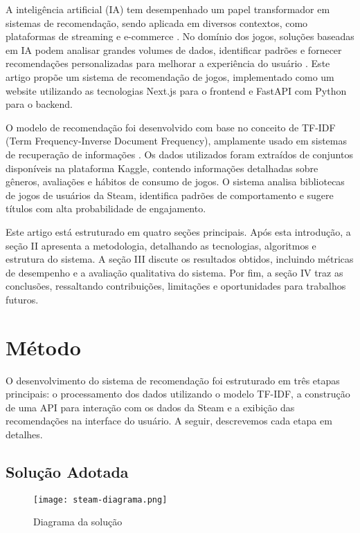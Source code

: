 \documentclass[conference]{IEEEtran}
\begin{document}
A inteligência artificial (IA) tem desempenhado um papel transformador em sistemas de recomendação, sendo aplicada em diversos contextos, como plataformas de streaming e e-commerce \cite{c3}. No domínio dos jogos, soluções baseadas em IA podem analisar grandes volumes de dados, identificar padrões e fornecer recomendações personalizadas para melhorar a experiência do usuário \cite{c4}. Este artigo propõe um sistema de recomendação de jogos, implementado como um website utilizando as tecnologias Next.js para o frontend e FastAPI com Python para o backend. 

O modelo de recomendação foi desenvolvido com base no conceito de TF-IDF (Term Frequency-Inverse Document Frequency), amplamente usado em sistemas de recuperação de informações \cite{c5}. Os dados utilizados foram extraídos de conjuntos disponíveis na plataforma Kaggle, contendo informações detalhadas sobre gêneros, avaliações e hábitos de consumo de jogos. O sistema analisa bibliotecas de jogos de usuários da Steam, identifica padrões de comportamento e sugere títulos com alta probabilidade de engajamento.

Este artigo está estruturado em quatro seções principais. Após esta introdução, a seção II apresenta a metodologia, detalhando as tecnologias, algoritmos e estrutura do sistema. A seção III discute os resultados obtidos, incluindo métricas de desempenho e a avaliação qualitativa do sistema. Por fim, a seção IV traz as conclusões, ressaltando contribuições, limitações e oportunidades para trabalhos futuros.

\section{Método}

O desenvolvimento do sistema de recomendação foi estruturado em três etapas principais: o processamento dos dados utilizando o modelo TF-IDF, a construção de uma API para interação com os dados da Steam e a exibição das recomendações na interface do usuário. A seguir, descrevemos cada etapa em detalhes.

\subsection{Solução Adotada}

\begin{figure}
    \centering
    \texttt{[image: steam-diagrama.png]}
    \caption{Diagrama da solução}
    \label{fig:diagrama}
\end{figure}
\end{document}
